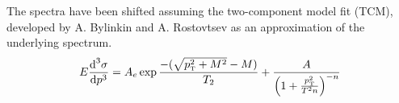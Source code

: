  The spectra have been shifted assuming the two-component model fit (\acs{TCM}), developed by A. Bylinkin and A. Rostovtsev \cite{Bylinkin2012bz,Bylinkin2011yi,Bylinkin2015xya} as an approximation of the underlying spectrum.
 		\begin{eqnarray}
 		\label{eq:TCM_Binshift}
  			E \frac{\mbox{d}^3 \sigma}{\mbox{d}p^3} = A_e \exp{\frac{-(\sqrt{p_{\text{\tiny T}}^2 + M^2} - M)}{T_{2}}} + \frac{A}{\left( 1+ \frac{p_{\text{\tiny T}}^2}{T^2 n}\right)^{-n}}
  			\label{eq:TwoComponentModel}
  		\end{eqnarray}
